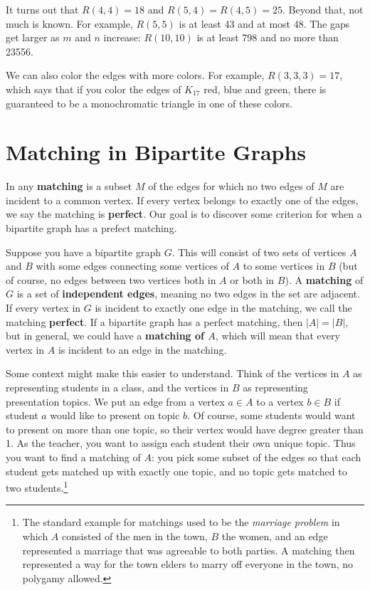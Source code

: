 \documentclass[10pt,]{book}
\newcommand{\terminology}[1]{\textbf{#1}}
\theoremstyle{plain}
\theoremstyle{definition}
\theoremstyle{definition}
\theoremstyle{definition}
\numberwithin{equation}{chapter}
\newcommand{\card}[1]{\left| #1 \right|}
\begin{document}
\hypertarget{p-430}{}%
It turns out that \(R(4,4) = 18\) and \(R(5, 4) = R(4,5) = 25\).  Beyond that, not much is known.  For example, \(R(5,5)\) is at least 43 and at most 48.  The gaps get larger as \(m\) and \(n\) increase: \(R(10,10)\) is at least 798 and no more than 23556.%
\par
\hypertarget{p-431}{}%
We can also color the edges with more colors.  For example, \(R(3,3,3) = 17\), which says that if you color the edges of \(K_{17}\) red, blue and green, there is guaranteed to be a monochromatic triangle in one of these colors.%
\typeout{************************************************}
\typeout{************************************************}
\section[{Matching in Bipartite Graphs}]{Matching in Bipartite Graphs}\label{sec_matchings}
\hypertarget{p-432}{}%
In any \terminology{matching} is a subset \(M\) of the edges for which no two edges of \(M\) are incident to a common vertex.  If every vertex belongs to exactly one of the edges, we say the matching is \terminology{perfect}. Our goal is to discover some criterion for when a bipartite graph has a prefect matching.%
\par
\hypertarget{p-433}{}%
 Suppose you have a bipartite graph \(G\). This will consist of two sets of vertices \(A\) and \(B\) with some edges connecting some vertices of \(A\) to some vertices in \(B\) (but of course, no edges between two vertices both in \(A\) or both in \(B\)). A \terminology{matching} of \(G\) is a set of \terminology{independent edges}, meaning no two edges in the set are adjacent.  If every vertex in \(G\) is incident to exactly one edge in the matching, we call the matching \terminology{perfect}. If a bipartite graph has a perfect matching, then \(\card{A} = \card{B}\), but in general, we could have a \terminology{matching of \(A\)}, which will mean that every vertex in \(A\) is incident to an edge in the matching.%
\par
\hypertarget{p-434}{}%
Some context might make this easier to understand. Think of the vertices in \(A\) as representing students in a class, and the vertices in \(B\) as representing presentation topics. We put an edge from a vertex \(a \in A\) to a vertex \(b \in B\) if student \(a\) would like to present on topic \(b\). Of course, some students would want to present on more than one topic, so their vertex would have degree greater than 1. As the teacher, you want to assign each student their own unique topic. Thus you want to find a matching of \(A\): you pick some subset of the edges so that each student gets matched up with exactly one topic, and no topic gets matched to two students.\footnote{The standard example for matchings used to be the \emph{marriage problem} in which \(A\) consisted of the men in the town, \(B\) the women, and an edge represented a marriage that was agreeable to both parties.  A matching then represented a way for the town elders to marry off everyone in the town, no polygamy allowed.\label{fn-6}}%
\end{document}
